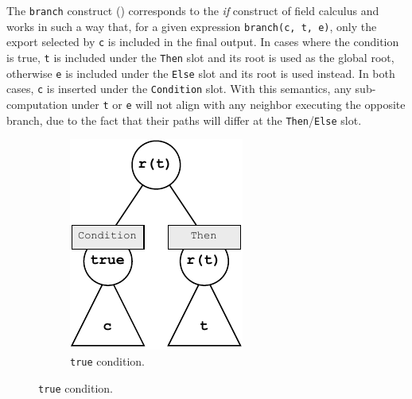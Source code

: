 The \texttt{branch} construct () corresponds to the \textit{if} construct of field calculus and works in such a way that, for a given expression \texttt{branch(c, t, e)}, only the export selected by \texttt{c} is included in the final output.
%
In cases where the condition is true, \texttt{t} is included under the \texttt{Then} slot and its root is used as the global root, otherwise \texttt{e} is included under the \texttt{Else} slot and its root is used instead.
%
In both cases, \texttt{c} is inserted under the \texttt{Condition} slot.
%
With this semantics, any sub-computation under \texttt{t} or \texttt{e} will not align with any neighbor executing the opposite branch, due to the fact that their paths will differ at the \texttt{Then}/\texttt{Else} slot.
%
\begin{figure}
    \centering
    \begin{subfigure}[b]{0.40\textwidth}
        \centering
        \includegraphics[width=\textwidth]{figures/semantics/branch-true.pdf}
        \caption{\texttt{true} condition.}
        \label{fig:semantics-branch-true}
    \end{subfigure}

\end{figure}
